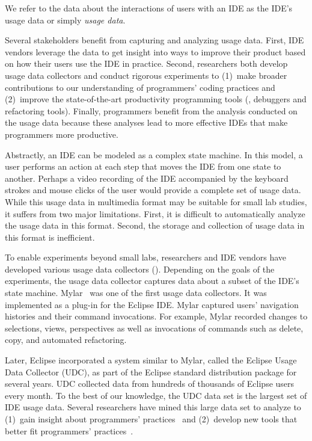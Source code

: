 
We refer to the data about the interactions of users with an IDE as the IDE's
usage data or simply \emph{usage data}.

%
Several stakeholders benefit from capturing and analyzing usage data. First, IDE
vendors leverage the data to get insight into ways to improve their product
based on how their users use the IDE in practice. Second, researchers both
develop usage data collectors and conduct rigorous experiments to (1)~make
broader contributions to our understanding of programmers' coding practices and
(2)~improve the state-of-the-art productivity programming tools (\eg, debuggers
and refactoring tools). Finally, programmers benefit from the analysis conducted
on the usage data because these analyses lead to more effective IDEs that make
programmers more productive.

Abstractly, an IDE can be modeled as a complex state machine. In this model, a
user performs an action at each step that moves the IDE from one state to
another.
%
Perhaps a video recording of the IDE accompanied by the keyboard strokes and
mouse clicks of the user would provide a complete set of usage data.
%
While this usage data in multimedia format may be suitable for small lab
studies, it suffers from two major limitations. First, it is difficult to
automatically analyze the usage data in this format. Second, the storage and
collection of usage data in this format is inefficient.

To enable experiments beyond small labs, researchers and IDE vendors have
developed various usage data collectors ().
Depending on the goals of the experiments, the usage data collector captures
data about a subset of the IDE's state machine.
%
Mylar~\cite{V:Murphy2006How} was one of the first usage data collectors. It was
implemented as a plug-in for the Eclipse IDE. Mylar captured users' navigation
histories and their command invocations. For example, Mylar recorded changes to
selections, views, perspectives as well as invocations of commands such as
delete, copy, and automated refactoring.

Later, Eclipse incorporated a system similar to Mylar, called the Eclipse Usage
Data Collector (UDC), as part of the Eclipse standard
distribution package for several years. UDC collected data from hundreds of
thousands of Eclipse users every month. To the best of our knowledge, the UDC
data set is the largest set of IDE usage data.
Several researchers have mined this large data set to analyze to 
%
(1)~gain insight about programmers'
practices~\cite{VakilianJohnson2014Alternate, VakilianETAL2013Compositional,
V:MurphyHill2012How} and
%
(2)~develop new tools that better fit programmers'
practices~\cite{MurphyHill2012Improving, VakilianETAL2013Compositional,
Kersten-Mylar2005}.

